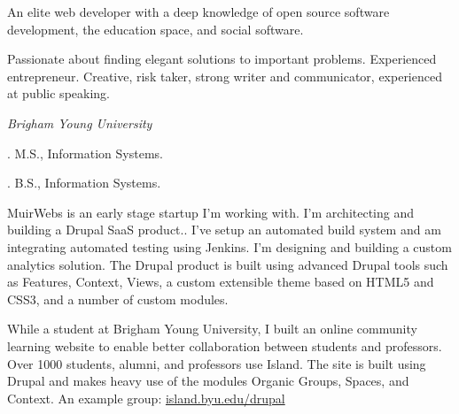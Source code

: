 \documentclass[11pt]{article}
\begin{document}
\medskip

\reversemarginpar

\medskip       

\medskip
{}

\noindent An elite web developer with a deep knowledge of open source software development, the education space, and social software.

\medskip

\noindent Passionate about finding elegant solutions to important problems. Experienced entrepreneur. Creative, risk taker, strong writer and communicator, experienced at public speaking.

\bigskip



\noindent\emph{Brigham Young University \vspace{0.15in}}

. M.S., Information Systems.

. B.S., Information Systems.

\bigskip
 
\medskip


\noindent MuirWebs is an early stage startup I'm working with. I'm architecting and building a Drupal SaaS product.. I’ve setup an automated build system and am integrating automated testing using Jenkins. I’m designing and building a custom analytics solution. The Drupal product is built using advanced Drupal tools such as Features, Context, Views, a custom extensible theme based on HTML5 and CSS3, and a number of custom modules.

\bigskip


\noindent While a student at Brigham Young University, I built an online community learning website to enable better collaboration between students and professors. Over 1000 students, alumni, and professors use Island. The site is built using Drupal and makes heavy use of the modules Organic Groups, Spaces, and Context. An example group: \href{https://island.byu.edu/drupal}{island.byu.edu/drupal}
\end{document}

